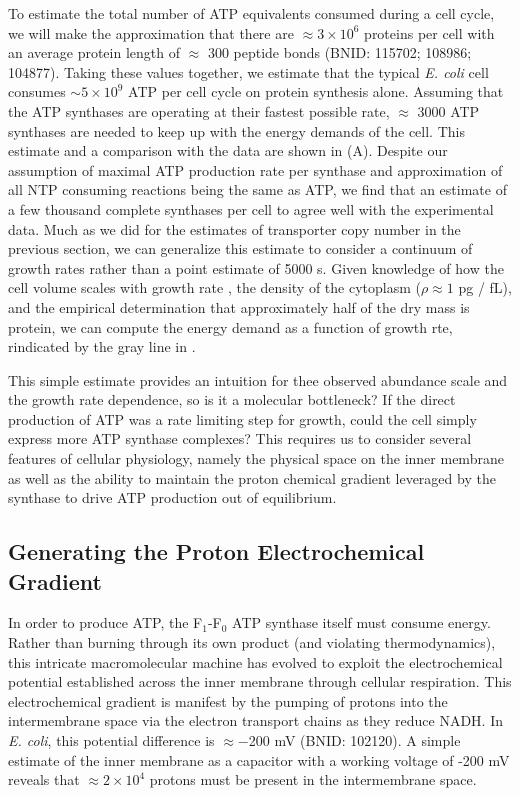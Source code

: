 To estimate the total number of ATP equivalents consumed during a cell cycle,
we will make the approximation that there are $\approx 3\times10^6$ proteins
per cell with an average protein length of $\approx$ 300 peptide bonds (BNID:
115702; 108986; 104877). Taking these values together, we estimate that the
typical \textit{E. coli} cell consumes $\sim 5 \times 10^9$ ATP per cell
cycle on protein synthesis alone. Assuming that the ATP synthases are
operating at their fastest possible rate, $\approx$ 3000 ATP synthases are
needed to keep up with the energy demands of the cell. This estimate and a
comparison with the data are shown in  (A). Despite
our assumption of maximal ATP production rate per synthase and approximation
of all NTP consuming reactions being the same as ATP, we find that an
estimate of a few thousand complete synthases per cell to agree well with the
experimental data. Much as we did for the estimates of transporter copy
number in the previous section, we can generalize this estimate to consider a
continuum of growth rates rather than a point estimate of 5000 s. Given
knowledge of how the cell volume scales with growth rate \citep{si2017}, the
density of the cytoplasm ($\rho \approx 1$ pg / fL), and the empirical
determination that approximately half of the dry mass is protein, we can
compute the energy demand as a function of growth rte, rindicated by the gray
line in .

This simple estimate provides an intuition for thee observed abundance scale
and the growth rate dependence, so is it a molecular bottleneck? If the
direct production of ATP was a rate limiting step for growth, could the cell
simply express more ATP synthase complexes? This requires us to consider
several features of cellular physiology, namely the physical space on the
inner membrane as well as the ability to maintain the proton chemical
gradient leveraged by the synthase to drive ATP production out of
equilibrium.

\subsection{Generating the Proton Electrochemical Gradient} In order to
produce ATP, the F$_1$-F$_0$ ATP synthase itself must consume energy. Rather
than burning through its own product (and violating thermodynamics), this
intricate macromolecular machine has evolved to exploit the electrochemical
potential established across the inner membrane through cellular respiration.
This electrochemical gradient is manifest by the pumping of protons into the
intermembrane space via the electron transport chains as they reduce NADH. In
\textit{E. coli}, this potential difference is $\approx -$200 mV (BNID:
102120). A simple estimate of the inner membrane as a capacitor with a
working voltage of -200 mV reveals that $\approx 2\times 10^4$ protons must
be present in the intermembrane space.

